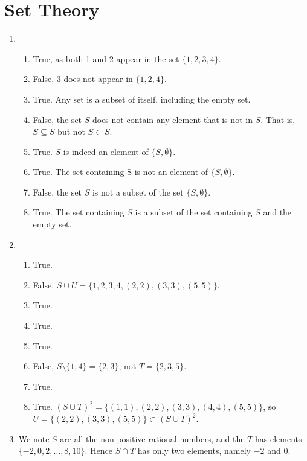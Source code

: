 \section{Set Theory}
\begin{enumerate}
    \item \begin{enumerate}[label=(\alph*)]
        \item True, as both 1 and 2 appear in the set $\{1, 2, 3, 4\}$.
        \item False, 3 does not appear in $\{1, 2, 4\}$.
        \item True. Any set is a subset of itself, including the empty set.
        \item False, the set $S$ does not contain any element that is not in $S$. That is, $S \subseteq S$ but not $S \subset S$.
        \item True. $S$ is indeed an element of $\{S, \emptyset\}$.
        \item True. The set containing S is not an element of $\{S, \emptyset\}$.
        \item False, the set $S$ is not a subset of the set $\{S, \emptyset\}$.
        \item True. The set containing $S$ is a subset of the set containing $S$ and the empty set.
    \end{enumerate}
    
    \item \begin{enumerate}[label=(\alph*)]
        \item True.
        \item False, $S \cup U = \{1, 2, 3, 4, (2, 2), (3, 3), (5, 5)\}$.
        \item True.
        \item True.
        \item True.
        \item False, $S \setminus \{1, 4\} = \{2, 3\}$, not $T = \{2, 3, 5\}$.
        \item True.
        \item True. $(S \cup T)^2 = \{(1,1), (2,2), (3,3), (4,4), (5,5)\}$, so $U = \{(2,2), (3,3), (5,5)\} \subset (S \cup T)^2$.
    \end{enumerate}

    \item We note $S$ are all the non-positive rational numbers, and the $T$ has elements $\{-2, 0, 2, \dots, 8, 10\}$. Hence $S \cap T$ has only two elements, namely $-2$ and $0$.
\end{enumerate}

